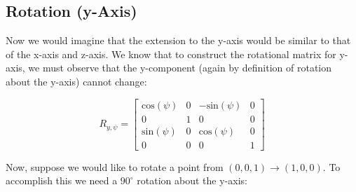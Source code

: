 \documentclass[12pt,letterpaper]{article}
\begin{document}
\subsection{Rotation (y-Axis)}
Now we would imagine that the extension to the y-axis would be similar to that of the x-axis and z-axis. We know that to construct the rotational matrix for y-axis, we must observe that the y-component (again by definition of rotation about the y-axis) cannot change:

\begin{equation}
    R_{y, \psi} = \begin{bmatrix}
        \text{cos}(\psi)    & 0     & -\text{sin}(\psi) & 0 \\
        0                   & 1     &  0                & 0 \\
       \text{sin}(\psi)     & 0     &  \text{cos}(\psi) & 0 \\
        0                   & 0     &  0                & 1
    \end{bmatrix}
\end{equation}

\newpage

Now, suppose we would like to rotate a point from $(0, 0, 1) \rightarrow (1, 0, 0)$. To accomplish this we need a $90^{\circ}$ rotation about the y-axis:
\end{document}
